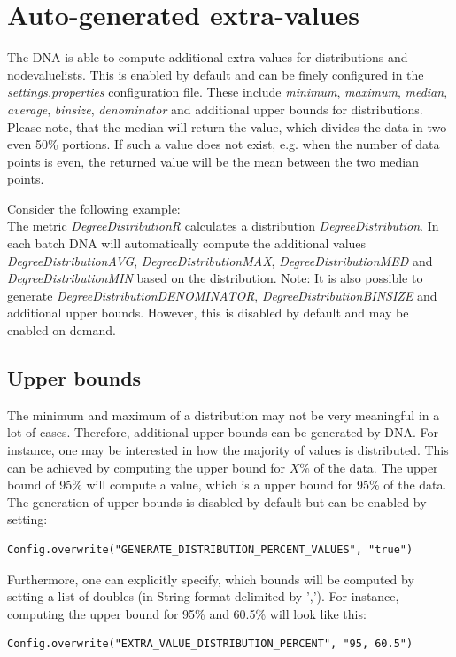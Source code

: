 \section{Auto-generated extra-values}
The DNA is able to compute additional extra values for distributions and nodevaluelists. This is enabled by default and can be finely configured in the \textit{settings.properties} configuration file. These include \textit{minimum}, \textit{maximum}, \textit{median}, \textit{average}, \textit{binsize}, \textit{denominator} and additional upper bounds for distributions. Please note, that the median will return the value, which divides the data in two even 50\% portions. If such a value does not exist, e.g. when the number of data points is even, the returned value will be the mean between the two median points. 

Consider the following example:\\
The metric \textit{DegreeDistributionR} calculates a distribution \textit{DegreeDistribution}. In each batch DNA will automatically compute the additional values \textit{DegreeDistribution\textunderscore AVG}, \textit{DegreeDistribution\textunderscore MAX}, \textit{DegreeDistribution\textunderscore MED} and \textit{DegreeDistribution\textunderscore MIN} based on the distribution. Note: It is also possible to generate \textit{DegreeDistribution\textunderscore DENOMINATOR}, \textit{DegreeDistribution\textunderscore BINSIZE} and additional upper bounds. However, this is disabled by default and may be enabled on demand.

\subsection{Upper bounds}
The minimum and maximum of a distribution may not be very meaningful in a lot of cases.  Therefore, additional upper bounds can be generated by DNA. For instance, one may be interested in how the majority of values is distributed. This can be achieved by computing the upper bound for $X$\% of the data. The upper bound of 95\% will compute a value, which is a upper bound for 95\% of the data. The generation of upper bounds is disabled by default but can be enabled by setting:
\begin{lstlisting}
Config.overwrite("GENERATE_DISTRIBUTION_PERCENT_VALUES", "true")
\end{lstlisting}
Furthermore, one can explicitly specify, which bounds will be computed by setting a list of doubles (in String format delimited by ','). For instance, computing the upper bound for 95\% and 60.5\% will look like this:
\begin{lstlisting}
Config.overwrite("EXTRA_VALUE_DISTRIBUTION_PERCENT", "95, 60.5")
\end{lstlisting}



 